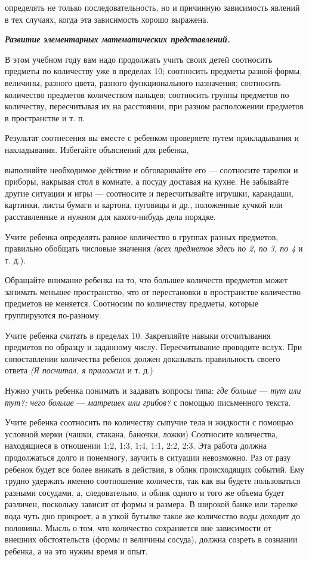 \documentclass{book}
\renewcommand{\emph}[1]{\textit{#1}}
\begin{document}
определять не только последовательность, но и причинную зависимость
явлений в тех случаях, когда эта зависимость хорошо выражена.

\emph{\textbf{Развитие элементарных математических представлений.}}

В этом учебном году вам надо продолжать учить своих детей соотносить
предметы по количеству уже в пределах 10; соотносить предметы разной
формы, величины, разного цвета, разного функционального назначения;
соотносить количество предметов количеством пальцев; соотносить группы
предметов по количеству, пересчитывая их на расстоянии, при разном
расположении предметов в пространстве и т. п.

Результат соотнесения вы вместе с ребенком проверяете путем
прикладывания и накладывания. Избегайте объяснений для ребенка,

выполняйте необходимое действие и обговаривайте его --- соотносите
тарелки и приборы, накрывая стол в комнате, а посуду доставая на кухне.
Не забывайте другие ситуации и игры --- соотносите и пересчитывайте
игрушки, карандаши, картинки, листы бумаги и картона, пуговицы и др.,
положенные кучкой или расставленные и нужном для какого-нибудь дела
порядке.

Учите ребенка определять равное количество в группах разных предметов,
правильно обобщать числовые значения \emph{(всех предметов здесь по 2,
по 3, по 4} и т. д.).

Обращайте внимание ребенка на то, что большее количеств предметов может
занимать меньшее пространство, что от перестановки в пространстве
количество предметов не меняется. Соотносим по количеству предметы,
которые группируются по-разному.

Учите ребенка считать в пределах 10. Закрепляйте навыки отсчитывания
предметов по образцу и заданному числу. Пересчитывание проводите вслух.
При сопоставлении количества ребенок должен доказывать правильность
своего ответа \emph{(Я посчитал, я приложил} и т. д.)

Нужно учить ребенка понимать и задавать вопросы типа: \emph{где больше}
--- \emph{тут или тут?; чего больше} --- \emph{матрешек или грибов?} с
помощью письменного текста.

Учите ребенка соотносить по количеству сыпучие тела и жидкости с помощью
условной мерки (чашки, стакана, баночки, ложки) Соотносите количества,
находящиеся в отношении 1:2, 1:3, 1:4, 1:1, 2:2, 2:3. Эта работа должна
продолжаться долго и понемногу, заучить в ситуации невозможно. Раз от
разу ребенок будет все более вникать в действия, в облик происходящих
событий. Ему трудно удержать именно соотношение количеств, так как вы
будете пользоваться разными сосудами, а, следовательно, и облик одного и
того же объема будет различен, поскольку зависит от формы и размера. В
широкой банке или тарелке вода чуть дно прикроет, а в узкой бутылке
такое же количество воды доходит до половины. Мысль о том, что
количество сохраняется вне зависимости от внешних обстоятельств (формы и
величины сосуда), должна созреть в сознании ребенка, а на это нужны
время и опыт.
\end{document}

